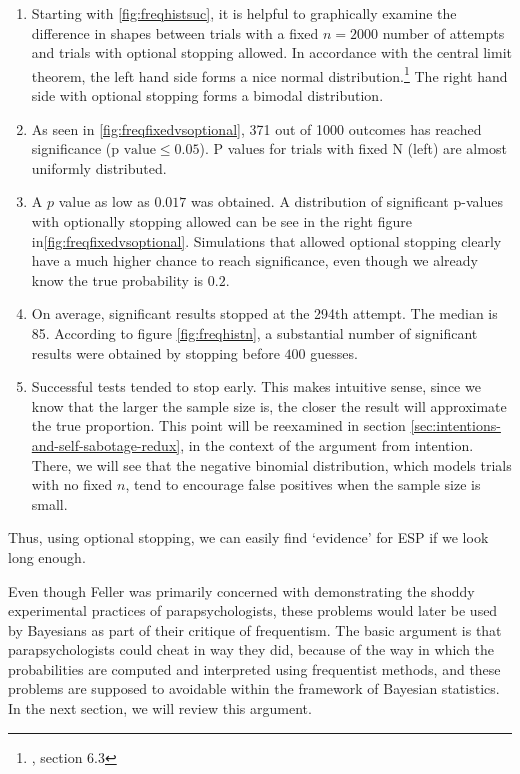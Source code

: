\begin{enumerate}
\def\labelenumi{\arabic{enumi}.}
\tightlist
\item
  Starting with \ref{fig:freqhistsuc}, it is helpful to graphically examine the difference in shapes between trials with a fixed $n=2000$  number of attempts and trials with optional stopping allowed. In accordance with the central limit theorem, the left hand side forms a nice normal distribution.\footnote{\cite{degroot}, section 6.3} The right hand side with optional stopping forms a bimodal distribution.
  
  \item As seen in \ref{fig:freqfixedvsoptional}, 371 out of 1000 outcomes has reached significance (\(\text{p value}\leq0.05\)). P values for trials with fixed N (left) are almost uniformly distributed.
\item
  A $p$ value as low as \(0.017\) was obtained. A distribution of significant p-values with optionally stopping allowed can be see in the right figure in\ref{fig:freqfixedvsoptional}. Simulations that allowed optional stopping clearly have a much higher chance to reach significance, even though we already know the true probability is $0.2$. 
\item
  On average, significant results stopped at the 294th attempt. The
  median is 85. According to figure  \ref{fig:freqhistn}, a substantial number of significant results were obtained by stopping before $400$ guesses. 
\item Successful tests tended to stop early. This makes intuitive sense, since we know that the larger the sample size is, the closer the result will approximate the true proportion. This point will be reexamined in section \ref{sec:intentions-and-self-sabotage-redux}, in the context of the argument from intention. There, we will see that the negative binomial distribution, which models trials with no fixed $n$, tend to encourage false positives when the sample size is small. \end{enumerate}



Thus, using optional stopping, we can easily find `evidence' for ESP if
we look long enough.

Even though Feller was primarily concerned with demonstrating the shoddy experimental
practices of parapsychologists, these problems would later be used by Bayesians as part of their critique of frequentism. The basic argument is that
parapsychologists could cheat in way they did, because of the way in
which the probabilities are computed and interpreted using frequentist methods, and these problems
are supposed to avoidable within the framework of Bayesian statistics.
In the next section, we will review this argument.

